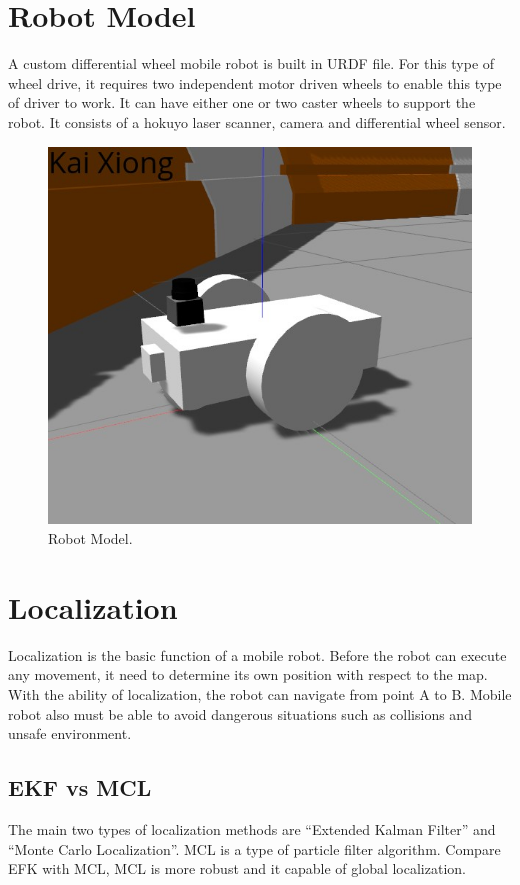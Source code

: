 \documentclass[10pt,journal,compsoc]{IEEEtran}
\begin{document}
\section{Robot Model}
A custom differential wheel mobile robot is built in URDF file.  For this type of wheel drive,
it requires two independent motor driven wheels to enable this type of driver to work. It can have either one or two caster wheels to support the robot. It consists of a hokuyo laser scanner, camera and differential wheel sensor.

\begin{figure}[thpb]
      \centering
      \includegraphics[scale=0.25]{Robot.jpg}
      \caption{Robot Model.}
      \label{fig:robot1}
\end{figure}

\section{Localization}
Localization is the basic function of a mobile robot. Before the robot can execute any movement, it need to determine its own position with respect to the map. With the ability of localization, the robot can navigate from point A to B. Mobile robot also must be able to avoid dangerous situations such as collisions and unsafe environment.

\subsection{EKF vs MCL}
The main two types of localization methods are “Extended Kalman Filter” and “Monte Carlo Localization”. MCL is a type of particle filter algorithm. Compare EFK with MCL, MCL is more robust and it capable of global localization.
\end{document}
